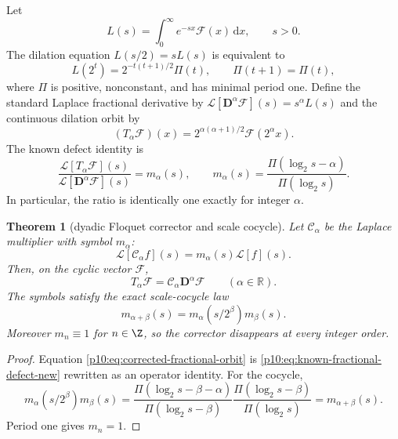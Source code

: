 \documentclass[11pt,oneside]{article}
\newtheorem{theorem}{Theorem}[section]
\theoremstyle{definition}
\theoremstyle{remark}
\newcommand{\R}{\mathbb R}
\newcommand{\dd}{\,\mathrm d}
\newcommand{\1}{\mathbf 1}
\begin{document}
Let
\begin{equation}\label{p10:eq:global-L-new}
 L(s)=\int_0^\infty e^{-sx}\mathcal F(x)\dd x,
 \qquad s>0.
\end{equation}
The dilation equation \(L(s/2)=sL(s)\) is equivalent to
\begin{equation}\label{p10:eq:global-L-Floquet}
 L(2^t)=2^{-t(t+1)/2}\Pi(t),
 \qquad \Pi(t+1)=\Pi(t),
\end{equation}
where \(\Pi\) is positive, nonconstant, and has minimal period one.  Define the
standard Laplace fractional derivative by
\(
 \mathcal L[\mathbf D^\alpha\mathcal F](s)=s^\alpha L(s)
\)
and the continuous dilation orbit by
\begin{equation}\label{p10:eq:Talpha-new}
 (T_\alpha\mathcal F)(x)
 =2^{\alpha(\alpha+1)/2}\mathcal F(2^\alpha x).
\end{equation}
The known defect identity is
\begin{equation}\label{p10:eq:known-fractional-defect-new}
 \frac{\mathcal L[T_\alpha\mathcal F](s)}
      {\mathcal L[\mathbf D^\alpha\mathcal F](s)}
 =m_\alpha(s),
 \qquad
 m_\alpha(s)=\frac{\Pi(\log_2s-\alpha)}{\Pi(\log_2s)}.
\end{equation}
In particular, the ratio is identically one exactly for integer \(\alpha\).

\begin{theorem}[dyadic Floquet corrector and scale cocycle]
\label{p10:thm:Floquet-corrector}
Let \(\mathcal C_\alpha\) be the Laplace multiplier with symbol \(m_\alpha\):
\begin{equation}\label{p10:eq:Calpha-def}
 \mathcal L[\mathcal C_\alpha f](s)=m_\alpha(s)\mathcal L[f](s).
\end{equation}
Then, on the cyclic vector \(\mathcal F\),
\begin{equation}\label{p10:eq:corrected-fractional-orbit}
 \boxed{
 T_\alpha\mathcal F
 =\mathcal C_\alpha\mathbf D^\alpha\mathcal F
 \qquad(\alpha\in\R).}
\end{equation}
The symbols satisfy the exact scale-cocycle law
\begin{equation}\label{p10:eq:Floquet-cocycle}
 m_{\alpha+\beta}(s)
 =m_\alpha(s/2^\beta)m_\beta(s).
\end{equation}
Moreover \(m_n\equiv1\) for \(n\in\Z\), so the corrector disappears at every integer
order.
\end{theorem}

\begin{proof}
Equation \eqref{p10:eq:corrected-fractional-orbit} is
\eqref{p10:eq:known-fractional-defect-new} rewritten as an operator identity.  For the
cocycle,
\[
 m_\alpha(s/2^\beta)m_\beta(s)
 =\frac{\Pi(\log_2s-\beta-\alpha)}{\Pi(\log_2s-\beta)}
  \frac{\Pi(\log_2s-\beta)}{\Pi(\log_2s)}
 =m_{\alpha+\beta}(s).
\]
Period one gives \(m_n=1\).
\end{proof}
\end{document}
